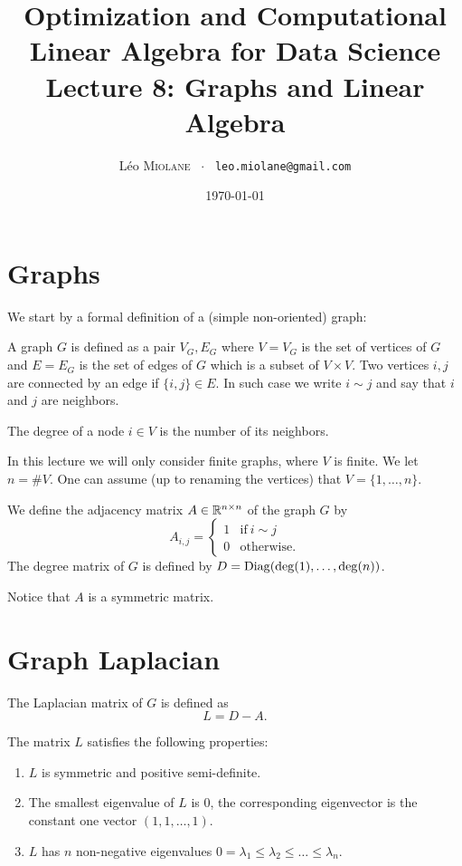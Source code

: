 \documentclass[11pt,nocut]{article}
\title{\vspace{-2.0cm}%
	Optimization and Computational Linear Algebra for Data Science\\
Lecture 8: Graphs and Linear Algebra}
\author{Léo \textsc{Miolane} \ $\cdot$ \ \texttt{leo.miolane@gmail.com}}
\date{\today}
\begin{document}
\maketitle


\section{Graphs}

We start by a formal definition of a (simple non-oriented) graph:
\begin{definition}[Graph]
	A graph $G$ is defined as a pair $V_G,E_G$ where $V=V_G$ is the set of vertices of $G$ and $E = E_G$ is the set of edges of $G$ which is a subset of $V \times V$.
	Two vertices $i,j$ are connected by an edge if $\{i,j\} \in E$. In such case we write $i \sim j$ and say that $i$ and $j$ are neighbors.
\end{definition}

\begin{definition}
	The degree of a node $i \in V$ is the number of its neighbors.
\end{definition}

In this lecture we will only consider finite graphs, where $V$ is finite. We let $n = \# V$. One can assume (up to renaming the vertices) that $V = \{1, \dots, n\}$.

\begin{definition}
	We define the adjacency matrix $A \in \mathbb{R}^{n \times n}$ of the graph $G$ by
	$$
	A_{i,j} = 
	\begin{cases}
		1 & \text{if} \ i \sim j \\
		0 & \text{otherwise.}
	\end{cases}
	$$
	The degree matrix of $G$ is defined by $D = {{\rm Diag}}({\rm deg}(1), \dots, {\rm deg}(n))$. 
\end{definition}

Notice that $A$ is a symmetric matrix.

\section{Graph Laplacian}

\begin{definition}
	The Laplacian matrix of $G$ is defined as
	$$
	L = D - A.
	$$
\end{definition}

\begin{proposition}
	The matrix $L$ satisfies the following properties:
	\begin{enumerate}
		\item $L$ is symmetric and positive semi-definite.
		\item The smallest eigenvalue of $L$ is $0$, the corresponding eigenvector is the constant one vector $(1,1, \dots, 1)$.
		\item $L$ has $n$ non-negative eigenvalues $0 = \lambda_1 \leq \lambda_2 \leq \dots \leq \lambda_n$.
	\end{enumerate}
\end{proposition}
\end{document}
